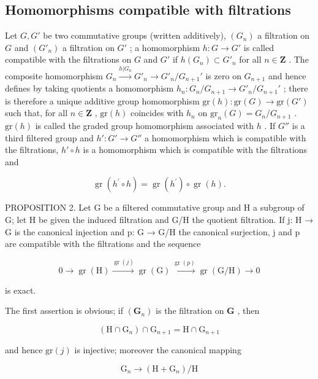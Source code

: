 \subsection{Homomorphisms compatible with filtrations}

Let \(G, G'\) be two commutative groups (written additively), \((G_n)\) a filtration on \(G\) and \((G'_n)\) a filtration on \(G'\) ; a homomorphism \(h: G \to G'\) is called compatible with the filtrations on \(G\) and \(G'\) if \(h(G_n) \subset G'_n\) for all \(n \in \mathbf{Z}\) . The composite homomorphism \(G_n \xrightarrow{h|G_n} G'_n \longrightarrow G'_n / G_{n+1}'\) is zero on \(G_{n+1}\) and hence defines by taking quotients a homomorphism \(h_n: G_n / G_{n+1} \to G'_n / G_{n+1}'\) ; there is therefore a unique additive group homomorphism \(\text{gr}(h): \text{gr}(G) \to \text{gr}(G')\) such that, for all \(n \in \mathbf{Z}\) , \(\text{gr}(h)\) coincides with \(h_n\) on \(\text{gr}_n(G) = G_n / G_{n+1}\) . \(\text{gr}(h)\) is called the graded group homomorphism associated with \(h\) . If \(G''\) is a third filtered group and \(h': G' \to G''\) a homomorphism which is compatible with the filtrations, \(h' \circ h\) is a homomorphism which is compatible with the filtrations and

\[
\operatorname{gr} (h ^ {\prime} \circ h) = \operatorname{gr} (h ^ {\prime}) \circ \operatorname{gr} (h).\tag{12}
\]

PROPOSITION 2. Let G be a filtered commutative group and H a subgroup of G; let H be given the induced filtration and G/H the quotient filtration. If j: H → G is the canonical injection and p: G → G/H the canonical surjection, j and p are compatible with the filtrations and the sequence

\[
0 \longrightarrow \operatorname{gr} (\mathrm{H}) \xrightarrow {\operatorname{gr} (j)} \operatorname{gr} (\mathrm{G}) \xrightarrow {\operatorname{gr} (p)} \operatorname{gr} (\mathrm{G} / \mathrm{H}) \longrightarrow 0\tag{13}
\]

is exact.

The first assertion is obvious; if \((\mathbf{G}_n)\) is the filtration on \(\mathbf{G}\) , then

\[
\left(\mathrm{H} \cap \mathrm{G} _ {n}\right) \cap \mathrm{G} _ {n + 1} = \mathrm{H} \cap \mathrm{G} _ {n + 1}
\]

and hence \(\mathrm{gr}(j)\) is injective; moreover the canonical mapping

\[
\mathrm{G} _ {n} \rightarrow (\mathrm{H} + \mathrm{G} _ {n}) / \mathrm{H}
\]


